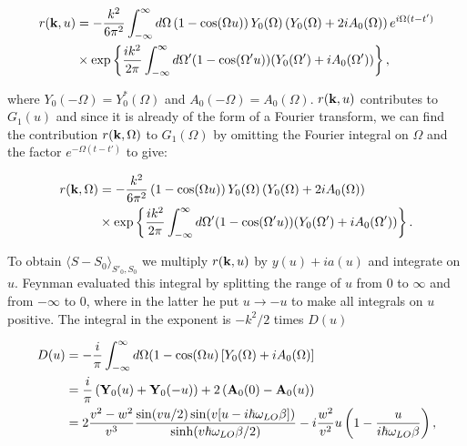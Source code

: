 \begin{equation}
    \begin{aligned}
        r(\vb{k}, u) &=  -\frac{k^2}{6\pi^2} \int^{\infty}_{-\infty} d\Omega \left(1 - \cos(\Omega u) \right) Y_0(\Omega) \left( Y_0(\Omega) + 2i A_0(\Omega) \right) e^{i\Omega (t - t')} \\
        &\times \exp\left\{ \frac{ik^2}{2\pi} \int^\infty_{-\infty} d\Omega' (1 - \cos(\Omega' u)) (Y_0(\Omega') + i A_0(\Omega')) \right\},
    \end{aligned}
\end{equation}

where $Y_0(-\Omega) = Y^*_0(\Omega)$ and $A_0(-\Omega) = A_0(\Omega)$. $r(\vb{k}, u)$ contributes to $G_1(u)$ and since it is already of the form of a Fourier transform, we can find the contribution $r(\vb{k}, \Omega)$ to $G_1(\Omega)$ by omitting the Fourier integral on $\Omega$ and the factor $e^{-\Omega(t - t')}$ to give:

\begin{equation}
    \begin{aligned}
        r(\vb{k}, \Omega) &= -\frac{k^2}{6\pi^2} \left(1 - \cos(\Omega u) \right) Y_0(\Omega) \left( Y_0(\Omega) + 2i A_0(\Omega) \right) \\
        &\times \exp\left\{ \frac{ik^2}{2\pi} \int^\infty_{-\infty} d\Omega' (1 - \cos(\Omega' u)) (Y_0(\Omega') + i A_0(\Omega')) \right\}.
    \end{aligned}
\end{equation}

To obtain $\langle S - S_0 \rangle_{S'_0, S_0}$ we multiply $r(\vb{k}, u)$ by $y(u) + ia(u)$ and integrate on $u$. Feynman evaluated this integral by splitting the range of $u$ from $0$ to $\infty$ and from $-\infty$ to $0$, where in the latter he put $u \to -u$ to make all integrals on $u$ positive. The integral in the exponent is $-k^2 / 2$ times $D(u)$

\begin{equation}\label{eqn:D_FHIP}
    \begin{aligned}
        D(u) &= -\frac{i}{\pi} \int^\infty_{-\infty} d\Omega (1 - \cos(\Omega u) \left[ Y_0(\Omega) + iA_0(\Omega) \right] \\
        &= \frac{i}{\pi} \left( \vb{Y}_0(u) + \vb{Y}_0(-u) \right) + 2 \left( \vb{A}_0(0) - \vb{A}_0(u) \right) \\
        &= 2 \frac{v^2-w^2}{v^3} \frac{\sin(vu/2) \sin(v[u-i\hbar\omega_{LO}\beta])}{\sinh(v\hbar\omega_{LO}\beta/2)}-i\frac{w^2}{v^2}u\left(1-\frac{u}{i\hbar\omega_{LO}\beta}\right),
    \end{aligned}
\end{equation}

